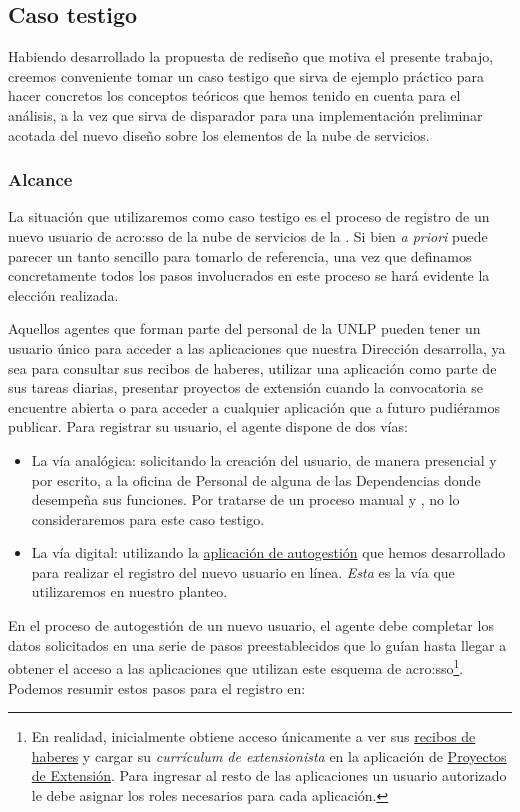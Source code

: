 \subsection{Caso testigo}
\label{caso-testigo}

Habiendo desarrollado la propuesta de rediseño que motiva el presente trabajo, creemos conveniente tomar un caso testigo que sirva de ejemplo práctico para hacer concretos los conceptos teóricos que hemos tenido en cuenta para el análisis, a la vez que sirva de disparador para una implementación preliminar acotada del nuevo diseño sobre los elementos de la nube de servicios.

\subsubsection{Alcance}

La situación que utilizaremos como caso testigo es el proceso de registro de un nuevo usuario de \gls{acro:sso} de la nube de servicios de la \unlp. Si bien \textit{a priori} puede parecer un tanto sencillo para tomarlo de referencia, una vez que definamos concretamente todos los pasos involucrados en este proceso se hará evidente la elección realizada.

Aquellos agentes que forman parte del personal de la UNLP pueden tener un usuario único para acceder a las aplicaciones que nuestra Dirección desarrolla, ya sea para consultar sus recibos de haberes, utilizar una aplicación como parte de sus tareas diarias, presentar proyectos de extensión cuando la convocatoria se encuentre abierta o para acceder a cualquier aplicación que a futuro pudiéramos publicar. Para registrar su usuario, el agente dispone de dos vías:

\begin{itemize}
  \item La vía analógica: solicitando la creación del usuario, de manera presencial y por escrito, a la oficina de Personal de alguna de las Dependencias donde desempeña sus funciones. Por tratarse de un proceso manual y , no lo consideraremos para este caso testigo.
  \item La vía digital: utilizando la \hyperref[anexo:detalle-clientes:sso]{aplicación de autogestión} que hemos desarrollado para realizar el registro del nuevo usuario en línea. \textit{Esta} es la vía que utilizaremos en nuestro planteo.
\end{itemize}

En el proceso de autogestión de un nuevo usuario, el agente debe completar los datos solicitados en una serie de pasos preestablecidos que lo guían hasta llegar a obtener el acceso a las aplicaciones que utilizan este esquema de \gls{acro:sso}\footnote{En realidad, inicialmente obtiene acceso únicamente a ver sus \hyperref[anexo:detalle-clientes:recibos]{recibos de haberes} y cargar su \textit{currículum de extensionista} en la aplicación de \hyperref[anexo:detalle-clientes:extension]{Proyectos de Extensión}. Para ingresar al resto de las aplicaciones un usuario autorizado le debe asignar los roles necesarios para cada aplicación.}. Podemos resumir estos pasos para el registro en:

